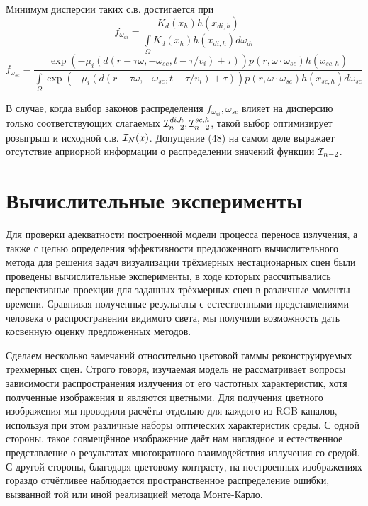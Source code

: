 \documentclass[12pt,reqno]{report}
\begin{document}
{Минимум дисперсии таких с.в. достигается при 
\begin{equation}
f_{\omega_{di}} =\frac{K_d(x_h) h(x_{di, h})} {\int\limits_{\Omega} K_d(x_h) h(x_{di, h}) d \omega_{di}}
\end{equation}
\begin{equation}
f_{\omega_{sc}} = \frac{\exp(- \mu_i (d(r-\tau\omega, -\omega_{sc}, t-\tau/v_i) + \tau)) p(r,\omega \cdot\omega_{sc}) h(x_{sc, h})}
{\int\limits_{\Omega}\exp(- \mu_i (d(r-\tau\omega, -\omega_{sc}, t-\tau/v_i) + \tau)) p(r,\omega \cdot\omega_{sc}) h(x_{sc, h}) d \omega_{sc}}
\end{equation}

В случае, когда выбор законов распределения $f_{\omega_{di}}, \omega_{sc}$ 
влияет на дисперсию только соответствующих слагаемых
${\cal I}_{n-2}^{di, h}, {\cal I}_{n-2}^{sc, h}$, 
такой выбор оптимизирует розыгрыш и исходной с.в. ${\cal I}_N(x)$.
Допущение (48) на самом деле выражает отсутствие 
априорной информации о распределении значений функции ${\cal I}_{n-2}$.

\section{Вычислительные эксперименты}

Для проверки адекватности построенной модели процесса переноса излучения, 
а также с целью определения эффективности предложенного вычислительного метода для решения
задач визуализации трёхмерных нестационарных сцен были проведены вычислительные эксперименты,
в ходе которых рассчитывались перспективные проекции для заданных трёхмерных сцен в 
различные моменты времени. Сравнивая полученные результаты с естественными представлениями 
человека о распространении видимого света, мы получили возможность дать косвенную оценку
предложенных методов.  

Сделаем несколько замечаний относительно цветовой гаммы реконструируемых трехмерных сцен. 
Строго говоря, изучаемая модель не рассматривает вопросы зависимости 
распространения излучения от его частотных характеристик,  хотя полученные изображения и являются цветными.
Для получения цветного изображения мы проводили расчёты отдельно для каждого из RGB каналов,
используя при этом различные наборы оптических характеристик среды.
С одной стороны, такое совмещённое изображение даёт нам наглядное и естественное представление о результатах
многократного взаимодействия излучения со средой.  С другой стороны, благодаря цветовому контрасту,  на построенных изображениях гораздо  отчётливее наблюдается  пространственное  распределение ошибки, вызванной той или иной реализацией метода Монте-Карло. 

}
\end{document}
